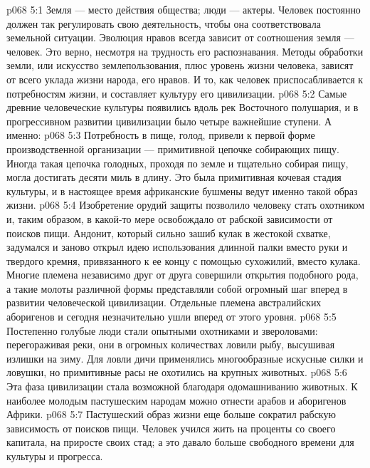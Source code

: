\vs p068 5:1 Земля --- место действия общества; люди --- актеры. Человек постоянно должен так регулировать свою деятельность, чтобы она соответствовала земельной ситуации. Эволюция нравов всегда зависит от соотношения земля --- человек. Это верно, несмотря на трудность его распознавания. Методы обработки земли, или искусство землепользования, плюс уровень жизни человека, зависят от всего уклада жизни народа, его нравов. И то, как человек приспосабливается к потребностям жизни, и составляет культуру его цивилизации.
\vs p068 5:2 Самые древние человеческие культуры появились вдоль рек Восточного полушария, и в прогрессивном развитии цивилизации было четыре важнейшие ступени. А именно:
\vs p068 5:3 \bibnobreakspace {} Потребность в пище, голод, привели к первой форме производственной организации --- примитивной цепочке собирающих пищу. Иногда такая цепочка голодных, проходя по земле и тщательно собирая пищу, могла достигать десяти миль в длину. Это была примитивная кочевая стадия культуры, и в настоящее время африканские бушмены ведут именно такой образ жизни.
\vs p068 5:4 \bibnobreakspace {} Изобретение орудий защиты позволило человеку стать охотником и, таким образом, в какой\hyp{}то мере освобождало от рабской зависимости от поисков пищи. Андонит, который сильно зашиб кулак в жестокой схватке, задумался и заново открыл идею использования длинной палки вместо руки и твердого кремня, привязанного к ее концу с помощью сухожилий, вместо кулака. Многие племена независимо друг от друга совершили открытия подобного рода, а такие молоты различной формы представляли собой огромный шаг вперед в развитии человеческой цивилизации. Отдельные племена австралийских аборигенов и сегодня незначительно ушли вперед от этого уровня.
\vs p068 5:5 Постепенно голубые люди стали опытными охотниками и звероловами: перегораживая реки, они в огромных количествах ловили рыбу, высушивая излишки на зиму. Для ловли дичи применялись многообразные искусные силки и ловушки, но примитивные расы не охотились на крупных животных.
\vs p068 5:6 \bibnobreakspace {} Эта фаза цивилизации стала возможной благодаря одомашниванию животных. К наиболее молодым пастушеским народам можно отнести арабов и аборигенов Африки.
\vs p068 5:7 Пастушеский образ жизни еще больше сократил рабскую зависимость от поисков пищи. Человек учился жить на проценты со своего капитала, на приросте своих стад; а это давало больше свободного времени для культуры и прогресса.
